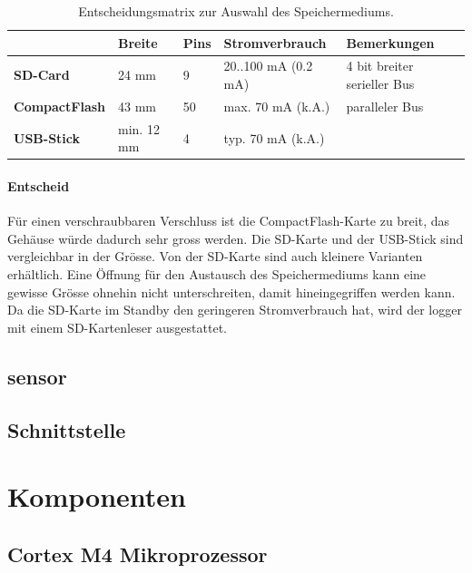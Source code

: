 \begin{table}
\begin{tabular}{|l|l|l|l|l|}
	\hline
	                      & \textbf{Breite} & \textbf{Pins} & \textbf{Stromverbrauch} & \textbf{Bemerkungen}        \\ \hline
	\textbf{SD-Card}      & 24 mm           & 9             & 20..100 mA (0.2 mA)     & 4 bit breiter serieller Bus \\ \hline
	\textbf{CompactFlash} & 43 mm           & 50            & max. 70 mA (k.A.)       & paralleler Bus              \\ \hline
	\textbf{USB-Stick}    & min. 12 mm      & 4             & typ. 70 mA (k.A.) &  \\ \hline
\end{tabular} 
\caption{Entscheidungsmatrix zur Auswahl des Speichermediums.}
\label{table.speichermedium}
\end{table} 



\paragraph{Entscheid} Für einen verschraubbaren Verschluss ist die CompactFlash-Karte zu breit, das Gehäuse würde dadurch sehr gross werden. Die SD-Karte und der USB-Stick sind vergleichbar in der Grösse. Von der SD-Karte sind auch kleinere Varianten erhältlich. Eine Öffnung für den Austausch des Speichermediums kann eine gewisse Grösse ohnehin nicht unterschreiten, damit hineingegriffen werden kann. Da die SD-Karte im Standby den geringeren Stromverbrauch hat, wird der \gls{logger} mit einem SD-Kartenleser ausgestattet.

\subsection{\gls{sensor}}

\subsection{Schnittstelle}



\section{Komponenten}
\subsection{Cortex M4 Mikroprozessor}

